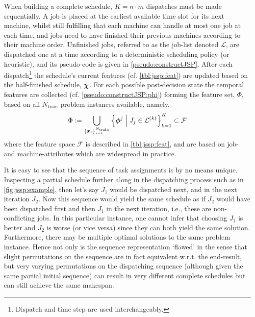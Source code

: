 \documentclass[smallextended]{svjour3}
\begin{document}
When building a complete schedule, $K=n\cdot m$ dispatches must be made 
sequentially.  A job is placed at the earliest available time slot for its next 
machine, whilst still fulfilling that each machine can handle at most one job 
at each time, and jobs need to have finished their previous machines according 
to their machine order. Unfinished jobs, referred to as the job-list denoted 
$\mathcal{L}$, are dispatched one at a time according to a deterministic 
scheduling policy (or heuristic), and its pseudo-code is given  in 
\cref{pseudo:constructJSP}. 
After each dispatch\footnote{Dispatch and time step are used interchangeably.} 
the schedule's current features (cf. \cref{tbl:jssp:feat}) are updated based on 
the half-finished schedule, $\bm \chi$. 
For each possible post-decision state the temporal features are collected (cf. 
\cref{pseudo:constructJSP:phi}) forming the feature set, $\Phi$, based on all 
$N_{\text{train}}$ problem instances available, namely, 
\begin{equation} \label{eq:Phi}
\Phi := \bigcup_{\{\vec{x}_i\}_{i=1}^{N_{\text{train}}}} 
\condset{\vphi^j}{J_j\in\mathcal{L}^{(k)}}_{k=1}^K
\subset\mathcal{F}
\end{equation}
where the feature space $\mathcal{F}$ is described in \cref{tbl:jssp:feat}, and 
are based on job- and machine-attributes which are widespread in practice.



It is easy to see that the sequence of task assignments is by no means unique. 
Inspecting a partial schedule further along in the dispatching process such as 
in \cref{fig:jssp:example}, then let's say $J_1$ would be dispatched next, and 
in the next iteration $J_2$. Now this sequence would yield the same schedule as 
if $J_2$ would have been dispatched first and then $J_1$ in the next iteration, 
i.e., these are non-conflicting jobs.  In this particular instance, one cannot 
infer that choosing $J_1$ is better and $J_2$ is worse (or vice versa) since
they can both yield the same solution. Furthermore, 
there may be multiple optimal solutions to the same 
problem instance. Hence not only is the sequence representation `flawed' in the 
sense that slight permutations on the sequence are in fact equivalent w.r.t. 
the end-result, but very varying permutations on the dispatching sequence 
(although given the same partial initial sequence) can result in very different 
complete schedules but can still achieve the same makespan. 
\end{document}
